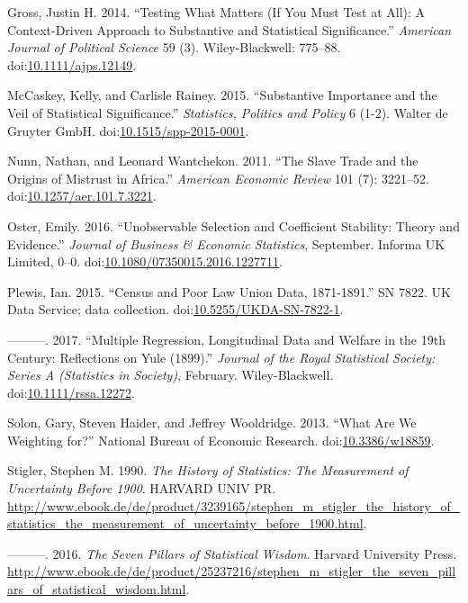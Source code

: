 \documentclass[]{article}
\begin{document}
\hypertarget{ref-Gross2014a}{}
Gross, Justin H. 2014. ``Testing What Matters (If You Must Test at All):
A Context-Driven Approach to Substantive and Statistical Significance.''
\emph{American Journal of Political Science} 59 (3). Wiley-Blackwell:
775--88.
doi:\href{https://doi.org/10.1111/ajps.12149}{10.1111/ajps.12149}.

\hypertarget{ref-McCaskeyRainey2015a}{}
McCaskey, Kelly, and Carlisle Rainey. 2015. ``Substantive Importance and
the Veil of Statistical Significance.'' \emph{Statistics, Politics and
Policy} 6 (1-2). Walter de Gruyter GmbH.
doi:\href{https://doi.org/10.1515/spp-2015-0001}{10.1515/spp-2015-0001}.

\hypertarget{ref-NunnWantchekon2011a}{}
Nunn, Nathan, and Leonard Wantchekon. 2011. ``The Slave Trade and the
Origins of Mistrust in Africa.'' \emph{American Economic Review} 101
(7): 3221--52.
doi:\href{https://doi.org/10.1257/aer.101.7.3221}{10.1257/aer.101.7.3221}.

\hypertarget{ref-Oster2016a}{}
Oster, Emily. 2016. ``Unobservable Selection and Coefficient Stability:
Theory and Evidence.'' \emph{Journal of Business \& Economic
Statistics}, September. Informa UK Limited, 0--0.
doi:\href{https://doi.org/10.1080/07350015.2016.1227711}{10.1080/07350015.2016.1227711}.

\hypertarget{ref-Plewis2015a}{}
Plewis, Ian. 2015. ``Census and Poor Law Union Data, 1871-1891.'' SN
7822. UK Data Service; data collection.
doi:\href{https://doi.org/10.5255/UKDA-SN-7822-1}{10.5255/UKDA-SN-7822-1}.

\hypertarget{ref-Plewis2017a}{}
---------. 2017. ``Multiple Regression, Longitudinal Data and Welfare in
the 19th Century: Reflections on Yule (1899).'' \emph{Journal of the
Royal Statistical Society: Series A (Statistics in Society)}, February.
Wiley-Blackwell.
doi:\href{https://doi.org/10.1111/rssa.12272}{10.1111/rssa.12272}.

\hypertarget{ref-SolonHaiderWooldridge2013a}{}
Solon, Gary, Steven Haider, and Jeffrey Wooldridge. 2013. ``What Are We
Weighting for?'' National Bureau of Economic Research.
doi:\href{https://doi.org/10.3386/w18859}{10.3386/w18859}.

\hypertarget{ref-Stigler1990a}{}
Stigler, Stephen M. 1990. \emph{The History of Statistics: The
Measurement of Uncertainty Before 1900}. HARVARD UNIV PR.
\url{http://www.ebook.de/de/product/3239165/stephen_m_stigler_the_history_of_statistics_the_measurement_of_uncertainty_before_1900.html}.

\hypertarget{ref-Stigler2016a}{}
---------. 2016. \emph{The Seven Pillars of Statistical Wisdom}. Harvard
University Press.
\url{http://www.ebook.de/de/product/25237216/stephen_m_stigler_the_seven_pillars_of_statistical_wisdom.html}.
\end{document}
